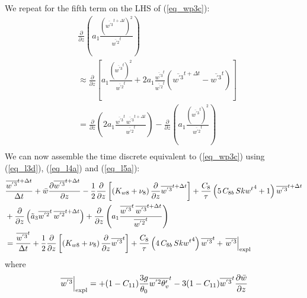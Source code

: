 \documentclass[11pt,fleqn]{article}
\newcommand{\ptlder}[2]{\frac{\partial #1}{\partial #2}}
\begin{document}
%
We repeat for the fifth term on the LHS of (\ref{eq_wp3c}):
%
\begin{equation}
\label{eq_l5a}
\begin{split}
& \ptlder{}{z} 
     \left(
        a_1 \frac{ \left( {\overline{w^{'3}}^{t + \Delta t}}\right)^2 }
                 { \overline{w^{'2}}^t }
     \right) \\
&\approx
  \ptlder{}{z}
  \left[
    a_1 \frac{ \left( {\overline{w^{'3}}^t}\right)^2 }
             { \overline{w^{'2}}^t }
  + 2 a_1 \frac{ \overline{w^{'3}}^t }{ \overline{w^{'2}}^t }
          \left( \overline{w^{'3}}^{t+\Delta t} - \overline{w^{'3}}^{t} \right) 
  \right] \\
&=
  \ptlder{}{z}
  \left(
    2 a_1 \frac{ \overline{w^{'3}}^t \, \overline{w^{'3}}^{t+\Delta t} }
               { \overline{w^{'2}}^t }
  \right)
- \ptlder{}{z}
  \left(
    a_1 \frac{ \left( {\overline{w^{'3}}^t}\right)^2 }
             { \overline{w^{'2}}^t }
  \right) \\
\end{split}
\end{equation}
%
We can now assemble the time discrete equivalent to (\ref{eq_wp3c}) using
(\ref{eq_l3d}), (\ref{eq_l4a}) and (\ref{eq_l5a}):
%
\begin{equation}
\label{eq_wp3d}
\begin{split}
& \frac{\overline{w^{'3}}^{t+\Delta t}}{\Delta t} 
+ \bar{w}\ptlder{\overline{w^{'3}}^{t+\Delta t}}{z}	 
- \frac{1}{2}\ptlder{}{z} \left[ \left( K_{w8} + \nu_8 \right)
                                 \ptlder{}{z} \overline{w^{'3}}^{t+\Delta t} 
                          \right]
+ \frac{C_8}{\tau}
   \left(  5 \, C_{8b} \, {Skw^t}^4 + 1 \right)
   \overline{w^{'3}}^{t + \Delta t}
\\ &
+ \ptlder{}{z} \left( \tilde{a}_3 \overline{w^{'2}}^t \, \overline{w^{'2}}^{t+\Delta t} \right)
+ \ptlder{}{z}
  \left(
    a_1 \frac{ \overline{w^{'3}}^t \, \overline{w^{'3}}^{t+\Delta t} }
             { \overline{w^{'2}}^t }
  \right)
\\
&=
  \frac{\overline{w^{'3}}^{t}}{\Delta t} 
  + \frac{1}{2}\ptlder{}{z} \left[ \left( K_{w8} + \nu_8 \right)
                                   \ptlder{}{z} \overline{w^{'3}}^{t} 
                            \right]
  +  \frac{C_8}{\tau}
      \left( 4 \, C_{8b} \, {Skw^t}^4 \right) \overline{w^{'3}}^t
  + \left. \overline{w^{'3}} \right|_{\rm expl}
\end{split}
\end{equation}
%
where
%
\begin{equation}
\label{eq_wp3t}
\left. \overline{w^{'3}} \right|_{\rm expl}
= 
  + (1 - C_{11}) \frac{3g}{\theta_0} \overline{w^{'2}\theta'_v}^t
  - 3 ( 1 - C_{11} ) \overline{w^{'3}}^t\ptlder{\bar{w}}{z}
\end{equation}
\end{document}
